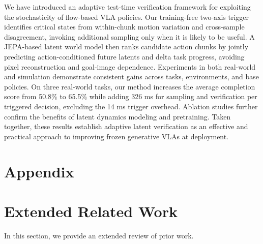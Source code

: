 \documentclass[10pt,twocolumn,letterpaper]{article}
\begin{document}
We have introduced an adaptive test-time verification framework for exploiting the stochasticity of flow-based VLA policies. Our training-free two-axis trigger identifies critical states from within-chunk motion variation and cross-sample disagreement, invoking additional sampling only when it is likely to be useful. A JEPA-based latent world model then ranks candidate action chunks by jointly predicting action-conditioned future latents and delta task progress, avoiding pixel reconstruction and goal-image dependence. Experiments in both real-world and simulation demonstrate consistent gains across tasks, environments, and base policies. On three real-world tasks, our method increases the average completion score from 50.8\% to 65.5\% while adding 326 ms for sampling and verification per triggered decision, excluding the 14 ms trigger overhead. Ablation studies further confirm the benefits of latent dynamics modeling and pretraining. Taken together, these results establish adaptive latent verification as an effective and practical approach to improving frozen generative VLAs at deployment.

\clearpage



\clearpage
\appendix
\onecolumn
\section*{Appendix}

\section{Extended Related Work}
\label{appendix:related_work}
In this section, we provide an extended review of prior work.
\end{document}
